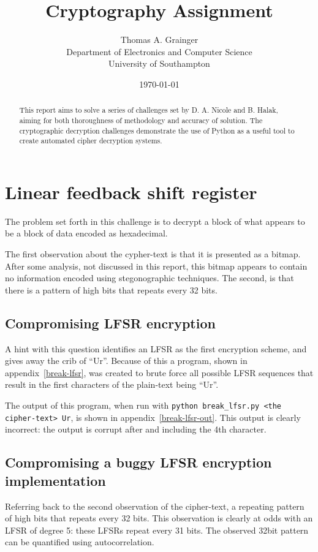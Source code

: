 \documentclass[pdftex, 12pt, a4paper]{article}
\title{Cryptography Assignment}
\author{
        Thomas A. Grainger \\
                Department of Electronics and Computer Science\\
        University of Southampton\\
}
\date{\today}
\begin{document}
\maketitle

\begin{abstract}
This report aims to solve a series of challenges set by D. A. Nicole and B. Halak\cite{instructions}, aiming for both thoroughness of methodology and accuracy of solution.  The cryptographic decryption challenges demonstrate the use of Python as a useful tool to create automated cipher decryption systems.
\end{abstract}

\tableofcontents
\pagebreak
\section{Linear feedback shift register}

The problem set forth in this challenge is to decrypt a block of what appears to be a block of data encoded as hexadecimal.

The first observation about the cypher-text is that it is presented as a bitmap. After some analysis, not discussed in this report, this bitmap appears to contain no information encoded using stegonographic techniques.  The second, is that there is a pattern of high bits that repeats every 32 bits.

\subsection{Compromising LFSR encryption}
A hint with this question identifies an LFSR as the first encryption scheme, and gives away the crib of ``Ur''.  Because of this a program, shown in appendix~\ref{break-lfsr}, was created to brute force all possible LFSR sequences that result in the first characters of the plain-text being ``Ur''.

The output of this program, when run with \verb`python break_lfsr.py <the cipher-text> Ur`, is shown in appendix~\ref{break-lfsr-out}.  This output is clearly incorrect: the output is corrupt after and including the 4th character.

\subsection{Compromising a buggy LFSR encryption implementation}
Referring back to the second observation of the cipher-text, a repeating pattern of high bits that repeats every 32 bits. This observation is clearly at odds with an LFSR of degree 5: these LFSRs repeat every 31 bits. The observed 32bit pattern can be quantified using autocorrelation.
\end{document}
